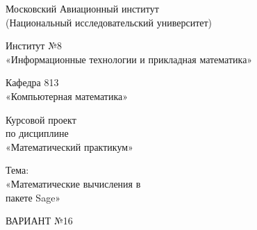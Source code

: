 \documentclass[12pt]{extreport}
\begin{document}
\begin{center}
Московский Авиационный институт \\
(Национальный исследовательский университет)
\end{center}

\vspace{1em}

\begin{center}
\Large Институт №8 \\
\large «Информационные технологии и прикладная математика» \\
\end{center}

\vspace{1em}

\begin{center}
	\large Кафедра 813 \\
	«Компьютерная математика» \\
\end{center}

\vspace{1em}

\begin{center}
\large Курсовой проект \\
по дисциплине \\
«Математический практикум»\\
\end{center}

\begin{center}
	\Large Тема:\\
	\large«Математические вычисления в \\
	пакете Sage»
\end{center}

\begin{center}
\Large ВАРИАНТ №16\\
\end{center}
\end{document}
